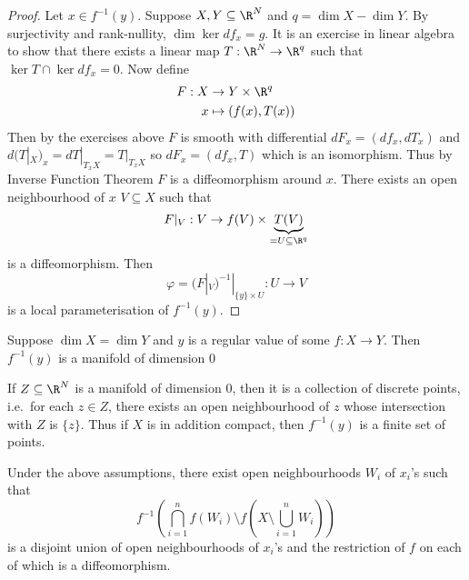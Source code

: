 \documentclass[a4paper]{article}
\begin{document}
\begin{proof}
  Let \(x \in f^{-1}(y)\). Suppose \(X, Y \subseteq \R^N\) and \(q = \dim X - \dim Y\). By surjectivity and rank-nullity, \(\dim \ker df_x = g\). It is an exercise in linear algebra to show that there exists a linear map \(T: \R^N \to \R^q\) such that \(\ker T \cap \ker df_x = 0\). Now define
  \begin{align*}
    F: X &\to Y \times \R^q \\
    x &\mapsto (f(x), T(x))
  \end{align*}
  Then by the exercises above \(F\) is smooth with differential \(dF_x = (df_x, dT_x)\) and \(d(T|_X)_x = dT|_{T_xX} = T|_{T_xX}\) so \(dF_x = (df_x, T)\) which is an isomorphism. Thus by Inverse Function Theorem \(F\) is a diffeomorphism around \(x\). There exists an open neighbourhood of \(x\) \(V \subseteq X\) such that
  \[
    F|_V: V \to f(V) \times \underbrace{T(V)}_{= U \subseteq \R^q}
  \]
  is a diffeomorphism. Then
  \[
    \varphi = (F|_V)^{-1}|_{\{y\} \times U}: U \to V
  \]
  is a local parameterisation of \(f^{-1}(y)\).
\end{proof}

\begin{corollary}
  Suppose \(\dim X = \dim Y\) and \(y\) is a regular value of some \(f: X \to Y\). Then \(f^{-1}(y)\) is a manifold of dimension \(0\)
\end{corollary}

If \(Z \subseteq \R^N\) is a manifold of dimension \(0\), then it is a collection of discrete points, i.e.\ for each \(z \in Z\), there exists an open neighbourhood of \(z\) whose intersection with \(Z\) is \(\{z\}\). Thus if \(X\) is in addition compact, then \(f^{-1}(y)\) is a finite set of points.

\begin{theorem}
  Under the above assumptions, there exist open neighbourhoods \(W_i\) of \(x_i\)'s such that
  \[
    f^{-1}\left(\bigcap_{i = 1}^n f(W_i) \setminus f(X \setminus \bigcup_{i = 1}^n W_i)\right)
  \]
  is a disjoint union of open neighbourhoods of \(x_i\)'s and the restriction of \(f\) on each of which is a diffeomorphism.
\end{theorem}




\printindex

\iffalse
Classical differential geometry concerning geometries of curves and surfaces, from a modern point of view

Contents:
I: notions of smmoth \(k\)-dim manifolds. We study differntial topology.

Geometry is concerned with the study of rigid motions

invariants of curves: \(k\) curvature, \(\tau\) torsion
invariant of surfaces: \(K\) mean curvature, \(K\) Gaussian curvature
\fi
\end{document}
